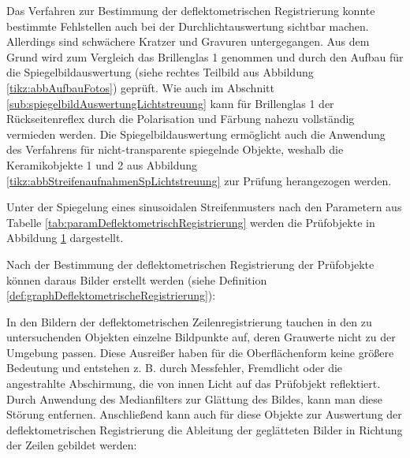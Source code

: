Das Verfahren zur Bestimmung der deflektometrischen Registrierung konnte bestimmte Fehlstellen auch bei der Durchlichtauswertung sichtbar machen.
Allerdings sind schwächere Kratzer und Gravuren untergegangen.
Aus dem Grund wird zum Vergleich das Brillenglas 1 genommen und durch den Aufbau für die Spiegelbildauswertung (siehe rechtes Teilbild aus Abbildung \ref{tikz:abbAufbauFotos}) geprüft.
Wie auch im Abschnitt \ref{sub:spiegelbildAuswertungLichtstreuung} kann für Brillenglas 1 der Rückseitenreflex durch die Polarisation und Färbung nahezu vollständig vermieden werden.
Die Spiegelbildauswertung ermöglicht auch die Anwendung des Verfahrens für nicht-transparente spiegelnde Objekte, weshalb die Keramikobjekte 1 und 2 aus Abbildung \ref{tikz:abbStreifenaufnahmenSpLichtstreuung} zur Prüfung herangezogen werden.

\p
Unter der Spiegelung eines sinusoidalen Streifenmusters nach den Parametern aus Tabelle \ref{tab:paramDeflektometrischRegistrierung} werden die Prüfobjekte in Abbildung \ref{tikz:abbSinusStreifenmusterSpiegel} dargestellt.

{
	\begin{figure}[H]
		\centering
		
		\label{tikz:abbSinusStreifenmusterSpiegel}
	\end{figure}
}

\noindent
Nach der Bestimmung der deflektometrischen Registrierung der Prüfobjekte können daraus Bilder erstellt werden (siehe Definition \ref{def:graphDeflektometrischeRegistrierung}):

{
	\begin{figure}[H]
		\centering
		
		\label{tikz:abbDeflectometricRegistrationsSpiegel}
	\end{figure}
}

\noindent
In den Bildern der deflektometrischen Zeilenregistrierung tauchen in den zu untersuchenden Objekten einzelne Bildpunkte auf, deren Grauwerte nicht zu der Umgebung passen.
Diese Ausreißer haben für die Oberflächenform keine größere Bedeutung und entstehen z. B. durch Messfehler, Fremdlicht oder die angestrahlte Abschirmung, die von innen Licht auf das Prüfobjekt reflektiert.
Durch Anwendung des Medianfilters zur Glättung des Bildes, kann man diese Störung entfernen.
Anschließend kann auch für diese Objekte zur Auswertung der deflektometrischen Registrierung die Ableitung der geglätteten Bilder in Richtung der Zeilen gebildet werden:

